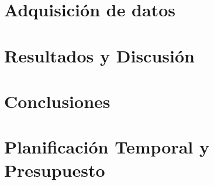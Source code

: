 \documentclass[a4paper,11pt,twoside]{report}
\begin{document}
\cleardoublepage
\chapter{Adquisición de datos}


\cleardoublepage
\chapter{Resultados y Discusión}


\cleardoublepage
\chapter{Conclusiones}


\cleardoublepage
\chapter{Planificación Temporal y Presupuesto}


\cleardoublepage
{}
\printbibliography
\end{document}
